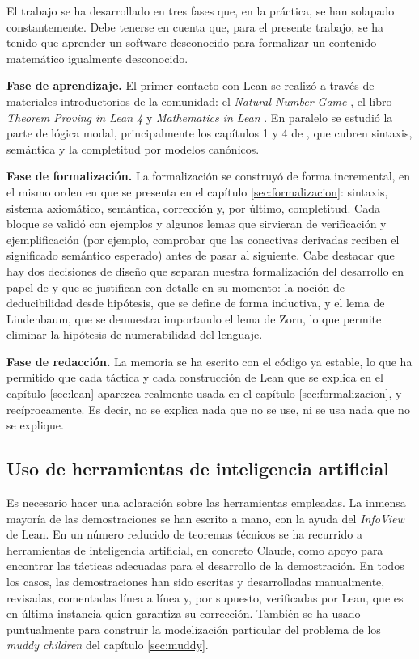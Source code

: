 El trabajo se ha desarrollado en tres fases que, en la práctica, se han solapado constantemente. Debe tenerse en cuenta que, para el presente trabajo, se ha tenido que aprender un software desconocido para formalizar un contenido matemático igualmente desconocido.

\textbf{Fase de aprendizaje.} El primer contacto con Lean se realizó a través de materiales introductorios de la comunidad: el \emph{Natural Number Game} \cite{nng}, el libro \emph{Theorem Proving in Lean 4} \cite{tpil} y \emph{Mathematics in Lean} \cite{mil}. En paralelo se estudió la parte de lógica modal, principalmente los capítulos 1 y 4 de \cite{blackburn}, que cubren sintaxis, semántica y la completitud por modelos canónicos.

\textbf{Fase de formalización.} La formalización se construyó de forma incremental, en el mismo orden en que se presenta en el capítulo \ref{sec:formalizacion}: sintaxis, sistema axiomático, semántica, corrección y, por último, completitud. Cada bloque se validó con ejemplos y algunos lemas que sirvieran de verificación y ejemplificación (por ejemplo, comprobar que las conectivas derivadas reciben el significado semántico esperado) antes de pasar al siguiente. Cabe destacar que hay dos decisiones de diseño que separan nuestra formalización del desarrollo en papel de \cite{blackburn} y que se justifican con detalle en su momento: la noción de deducibilidad desde hipótesis, que se define de forma inductiva, y el lema de Lindenbaum, que se demuestra importando el lema de Zorn, lo que permite eliminar la hipótesis de numerabilidad del lenguaje.

\textbf{Fase de redacción.} La memoria se ha escrito con el código ya estable, lo que ha permitido que cada táctica y cada construcción de Lean que se explica en el capítulo \ref{sec:lean} aparezca realmente usada en el capítulo \ref{sec:formalizacion}, y recíprocamente. Es decir, no se explica nada que no se use, ni se usa nada que no se explique.

\subsection*{Uso de herramientas de inteligencia artificial}

Es necesario hacer una aclaración sobre las herramientas empleadas. La inmensa mayoría de las demostraciones se han escrito a mano, con la ayuda del \emph{InfoView} de Lean. En un número reducido de teoremas técnicos se ha recurrido a herramientas de inteligencia artificial, en concreto Claude, como apoyo para encontrar las tácticas adecuadas para el desarrollo de la demostración. En todos los casos, las demostraciones han sido escritas y desarrolladas manualmente, revisadas, comentadas línea a línea y, por supuesto, verificadas por Lean, que es en última instancia quien garantiza su corrección. También se ha usado puntualmente para construir la modelización particular del problema de los \emph{muddy children} del capítulo \ref{sec:muddy}.

